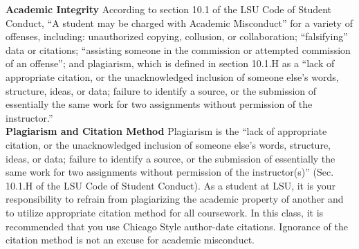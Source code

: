 \documentclass[11pt,article,oneside]{memoir}
\begin{document}
\noindent \textbf{Academic Integrity}
According to section 10.1 of the LSU Code of Student Conduct, ``A student may be charged with Academic Misconduct'' for a variety of offenses, including: unauthorized copying, collusion, or collaboration; ``falsifying'' data or citations; ``assisting someone in the commission or attempted commission of an offense''; and plagiarism, which is defined in section 10.1.H as a ``lack of appropriate citation, or the unacknowledged inclusion of someone else's words, structure, ideas, or data; failure to identify a source, or the submission of essentially the same work for two assignments without permission of the instructor.''\\

\noindent \textbf{Plagiarism and Citation Method}
Plagiarism is the ``lack of appropriate citation, or the unacknowledged inclusion of someone else's words, structure, ideas, or data; failure to identify a source, or the submission of essentially the same work for two assignments without permission of the instructor(s)'' (Sec. 10.1.H of the LSU Code of Student Conduct). As a student at LSU, it is your responsibility to refrain from plagiarizing the academic property of another and to utilize appropriate citation method for all coursework. In this class, it is recommended that you use Chicago Style author-date citations. Ignorance of the citation method is not an excuse for academic misconduct.
\end{document}
